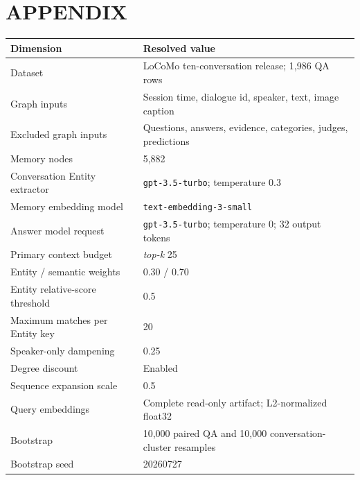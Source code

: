 \documentclass[a4paper,twoside]{article}
\newcommand{\topk}{\textit{top-k}}
\begin{document}
\begingroup
\small


\endgroup

\noindent\begin{minipage}{\columnwidth}
\section*{\uppercase{Appendix}}


\label{app:config}

\small
\centering
\captionsetup{hypcap=false}
\label{tab:config}
\begin{tabularx}{\columnwidth}{@{}>{\raggedright\arraybackslash}p{}X@{}}
\toprule
Dimension & Resolved value \\
\midrule
Dataset & LoCoMo ten-conversation release; 1,986 QA rows \\
Graph inputs & Session time, dialogue id, speaker, text, image caption \\
Excluded graph inputs & Questions, answers, evidence, categories, judges, predictions \\
Memory nodes & 5,882 \\
Conversation Entity extractor & \texttt{gpt-3.5-turbo}; temperature 0.3 \\
Memory embedding model & \texttt{text-embedding-3-small} \\
Answer model request & \texttt{gpt-3.5-turbo}; temperature 0; 32 output tokens \\
Primary context budget & \topk{} 25 \\
Entity / semantic weights & 0.30 / 0.70 \\
Entity relative-score threshold & 0.5 \\
Maximum matches per Entity key & 20 \\
Speaker-only dampening & 0.25 \\
Degree discount & Enabled \\
Sequence expansion scale & 0.5 \\
Query embeddings & Complete read-only artifact; L2-normalized float32 \\
Bootstrap & 10,000 paired QA and 10,000 conversation-cluster resamples \\
Bootstrap seed & 20260727 \\
\bottomrule
\end{tabularx}
\end{minipage}
\end{document}
